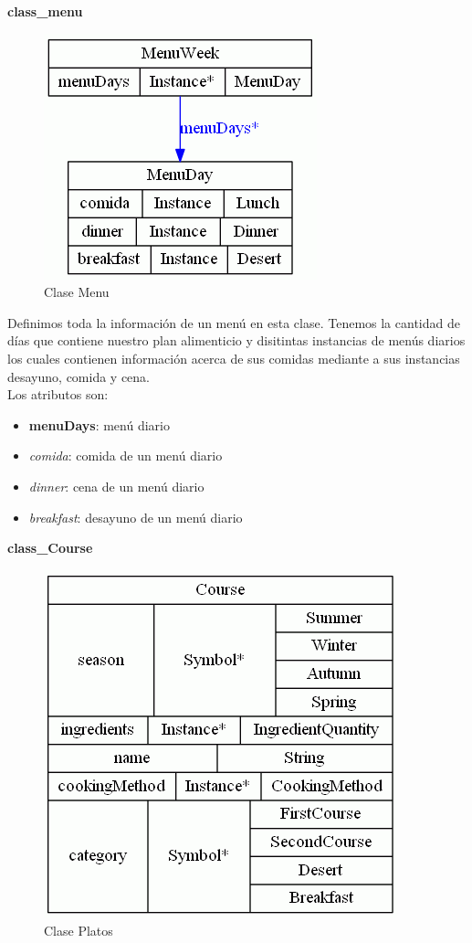 \documentclass[12]{article}
\begin{document}
\textbf{class\_menu}
\begin{figure}[H]
\centering
\includegraphics[scale=0.5]{images/classMenu.png}
\caption{Clase Menu}
\label{menu}
\end{figure}

Definimos toda la información de un menú en esta clase. Tenemos la cantidad de días que contiene nuestro plan alimenticio y disitintas instancias de menús diarios los cuales contienen información acerca de sus comidas mediante a sus instancias desayuno, comida y cena. 
\\

Los atributos son: 
\begin{itemize}
\item \textbf{menuDays}: menú diario
\item \textit{comida}: comida de un menú diario
\item \textit{dinner}: cena de un menú diario
\item \textit{breakfast}: desayuno de un menú diario
\end{itemize}

\vspace{0.5cm}

\textbf{class\_Course}
\begin{figure}[H]
\centering
\includegraphics[scale=0.5]{images/classCourse.png}
\caption{Clase Platos}
\label{platos}
\end{figure}
\end{document}
